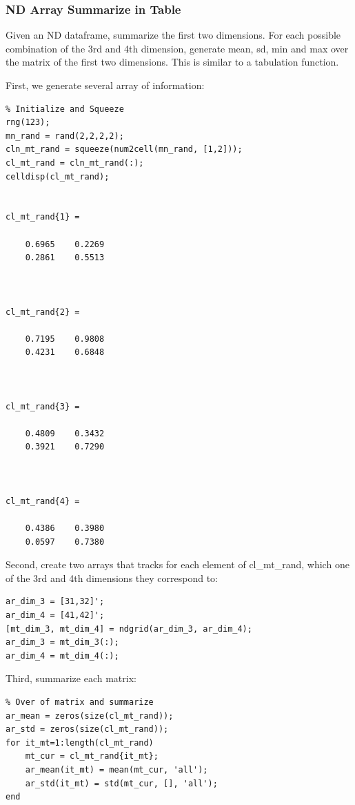 \documentclass[
]{book}
\begin{document}
\hypertarget{nd-array-summarize-in-table}{%
\subsubsection{ND Array Summarize in Table}\label{nd-array-summarize-in-table}}

Given an ND dataframe, summarize the first two dimensions. For each
possible combination of the 3rd and 4th dimension, generate mean, sd,
min and max over the matrix of the first two dimensions. This is similar
to a tabulation function.

First, we generate several array of information:

\begin{verbatim}
% Initialize and Squeeze
rng(123);
mn_rand = rand(2,2,2,2);
cln_mt_rand = squeeze(num2cell(mn_rand, [1,2]));
cl_mt_rand = cln_mt_rand(:);
celldisp(cl_mt_rand);


cl_mt_rand{1} =
 
    0.6965    0.2269
    0.2861    0.5513



cl_mt_rand{2} =
 
    0.7195    0.9808
    0.4231    0.6848



cl_mt_rand{3} =
 
    0.4809    0.3432
    0.3921    0.7290



cl_mt_rand{4} =
 
    0.4386    0.3980
    0.0597    0.7380
\end{verbatim}

Second, create two arrays that tracks for each element of cl\_mt\_rand,
which one of the 3rd and 4th dimensions they correspond to:

\begin{verbatim}
ar_dim_3 = [31,32]';
ar_dim_4 = [41,42]';
[mt_dim_3, mt_dim_4] = ndgrid(ar_dim_3, ar_dim_4);
ar_dim_3 = mt_dim_3(:);
ar_dim_4 = mt_dim_4(:);
\end{verbatim}

Third, summarize each matrix:

\begin{verbatim}
% Over of matrix and summarize
ar_mean = zeros(size(cl_mt_rand));
ar_std = zeros(size(cl_mt_rand));
for it_mt=1:length(cl_mt_rand)
    mt_cur = cl_mt_rand{it_mt};
    ar_mean(it_mt) = mean(mt_cur, 'all');
    ar_std(it_mt) = std(mt_cur, [], 'all');
end
\end{verbatim}
\end{document}
